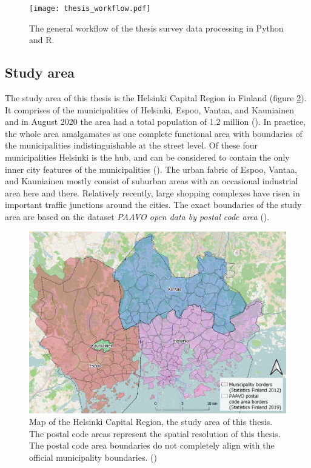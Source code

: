 \newpage
\begin{figure}[H]
    \centering
    \texttt{[image: thesis\_workflow.pdf]}
    \caption{The general workflow of the thesis survey data processing in Python and R.}
    \label{fig:gen_workflow}
\end{figure}

\subsection{Study area}
\justify

The study area of this thesis is the Helsinki Capital Region in Finland (figure \ref{fig:thesis_resarea}). It comprises of the municipalities of Helsinki, Espoo, Vantaa, and Kauniainen and in August 2020 the area had a total population of 1.2 million (\cite{StatisticsFinland2020a}). In practice, the whole area amalgamates as one complete functional area with boundaries of the municipalities indistinguishable at the street level. Of these four municipalities Helsinki is the hub, and can be considered to contain the only inner city features of the municipalities (\cite{FinnishEnvironmentInstitute2013}). The urban fabric of Espoo, Vantaa, and Kauniainen mostly consist of suburban areas with an occasional industrial area here and there. Relatively recently, large shopping complexes have risen in important traffic junctions around the cities. The exact boundaries of the study area are based on the dataset \textit{PAAVO open data by postal code area} (\cite{StatisticsFinland2019a}).

\begin{figure}[H]%
    \includegraphics[width=\textwidth]{images/thesis_resarea.png}
    \caption[Study area]{Map of the Helsinki Capital Region, the study area of this thesis. The postal code areas represent the spatial resolution of this thesis. The postal code area boundaries do not completely align with the official municipality boundaries. (\cite{OpenStreetMap})}%
    \label{fig:thesis_resarea}%
\end{figure}

